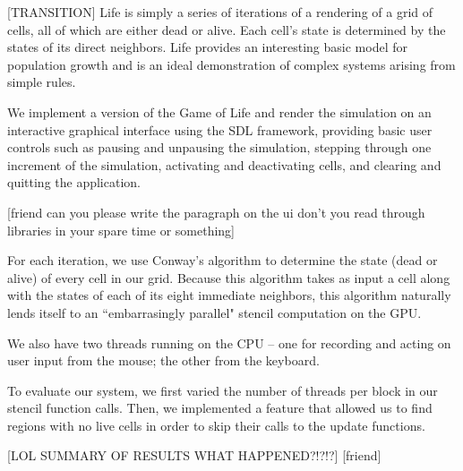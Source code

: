 \documentclass[12pt]{article}
\begin{document}
	[TRANSITION] Life is simply a series of iterations of a rendering of a grid of cells, all of which are either dead or alive. Each cell's state is determined by the states of its direct neighbors. Life provides an interesting basic model for population growth and is an ideal demonstration of complex systems arising from simple rules. 

        We implement a version of the Game of Life and render the simulation on
        an interactive graphical interface using the SDL framework, providing
        basic user controls such as pausing and unpausing the simulation,
        stepping through one increment of the simulation, activating and
        deactivating cells, and clearing and quitting the application.

	[friend can you please write the paragraph on the ui don't you read through libraries in your spare time or something]
	
	For each iteration, we use Conway's algorithm to determine the state (dead or alive) of every cell in our grid. Because this algorithm takes as input a cell along with the states of each of its eight immediate neighbors, this algorithm naturally lends itself to an ``embarrasingly parallel" stencil computation on the GPU.
	
	We also have two threads running on the CPU -- one for recording and acting on user input from the mouse; the other from the keyboard. 
	
	To evaluate our system, we first varied the number of threads per block in our stencil function calls. Then, we implemented a feature that allowed us to find regions with no live cells in order to skip their calls to the update functions. 
	
	[LOL SUMMARY OF RESULTS WHAT HAPPENED?!?!?] [friend]
\end{document}
